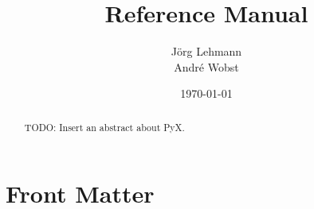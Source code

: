 \documentclass{manual}
\title{\PyX{} Reference Manual}
\author{J\"org Lehmann\\
Andr\'e Wobst}
\date{\today}
\def\PyX{PyX}
\begin{document}
\maketitle

\ifhtml %
\chapter*{Front Matter\label{front}}
\fi
\begin{abstract}
\noindent
TODO: Insert an abstract about \PyX{}.
\end{abstract}

\tableofcontents














\appendix







\end{document}
